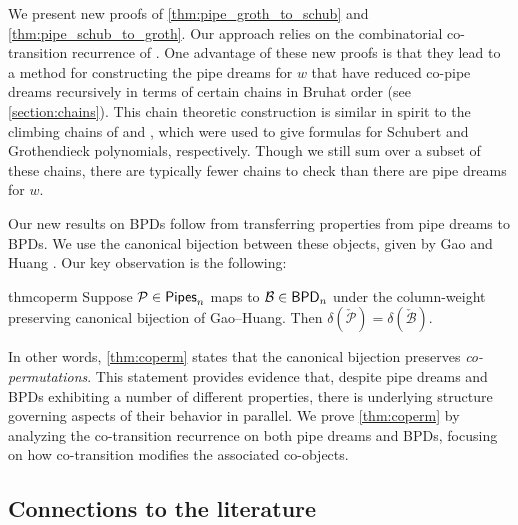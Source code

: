 \documentclass[12 pt]{amsart}
\numberwithin{equation}{section}
\theoremstyle{remark}
\newcommand{\pipes}{{\sf Pipes}}
\newcommand{\bpd}{{\sf BPD}}
\newcommand{\demprod}{\delta}
\begin{document}
	We present new proofs of \cref{thm:pipe_groth_to_schub} and \cref{thm:pipe_schub_to_groth}. 
	Our approach relies on the combinatorial co-transition recurrence of \cite{Knutson:cotransition}. 
	One advantage of these new proofs is that they lead to a method for constructing the pipe dreams for $w$ that have reduced co-pipe dreams recursively in terms of certain chains in Bruhat order (see \cref{section:chains}). 
	This chain theoretic construction is similar in spirit to the climbing chains of \cite{Bergeron.Sottile.2002} and \cite{Lenart.Robinson.Sottile}, which were used to give formulas for Schubert and Grothendieck polynomials, respectively. 
	Though we still sum over a subset of these chains, there are typically fewer chains to check than there are pipe dreams for $w$.
	

	
	Our new results on BPDs follow from transferring properties from pipe dreams to BPDs. 
	We use the canonical bijection between these objects, given by Gao and Huang \cite{Gao.Huang}.
	Our key observation is the following:
	\begin{restatable}{thm}{coperm}
		\label{thm:coperm}
		Suppose $\mathcal{P} \in \pipes_n$ maps to $\mathcal{B} \in \bpd_n$ under the column-weight preserving canonical bijection of Gao--Huang. 
		Then $\demprod(\check{\mathcal{P}}) = \demprod(\check{\mathcal{B}})$.
	\end{restatable}
	
	In other words, \cref{thm:coperm} states that the canonical bijection preserves \emph{co-permutations}. 
	This statement provides evidence that, despite pipe dreams and BPDs exhibiting a number of different properties, there is underlying structure governing aspects of their behavior in parallel. 
	We prove \cref{thm:coperm} by analyzing the co-transition recurrence on both pipe dreams and BPDs, focusing on how co-transition modifies the associated co-objects.
	
\subsection{Connections to the literature}
	
\end{document}
